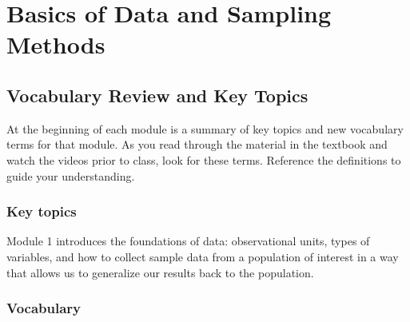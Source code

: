 \documentclass[
]{report}
\begin{document}
\nocite{*}

\chapter{Basics of Data and Sampling Methods}\label{basics-of-data-and-sampling-methods}

\section{Vocabulary Review and Key Topics}\label{vocabulary-review-and-key-topics}

At the beginning of each module is a summary of key topics and new vocabulary terms for that module. As you read through the material in the textbook and watch the videos prior to class, look for these terms. Reference the definitions to guide your understanding.

\subsection{Key topics}\label{key-topics}

Module 1 introduces the foundations of data: observational units, types of variables, and how to collect sample data from a population of interest in a way that allows us to generalize our results back to the population.

\subsection{Vocabulary}\label{vocabulary}
\end{document}

